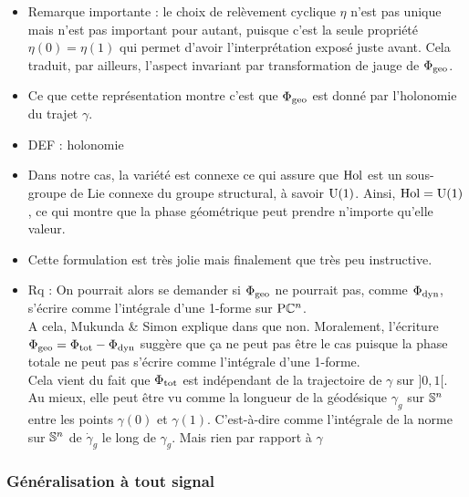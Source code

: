 \begin{itemize}
	\item Remarque importante : le choix de relèvement cyclique $\eta$ n'est pas unique mais n'est pas important pour autant, puisque c'est la seule propriété $\eta(0)=\eta(1)$ qui permet d'avoir l'interprétation exposé juste avant. Cela traduit, par ailleurs, l'aspect invariant par transformation de jauge de $\phaseg$.
	
	\item Ce que cette représentation montre c'est que $\phaseg$ est donné par l'holonomie du trajet $\gamma$.
	
	\item DEF : holonomie
	
	\item Dans notre cas, la variété est connexe ce qui assure que $\Hol$ est un sous-groupe de Lie connexe du groupe structural, à savoir $\U{1}$. Ainsi, $\Hol = \U{1}$, ce qui montre que la phase géométrique peut prendre n'importe qu'elle valeur.
	
	\item Cette formulation est très jolie mais finalement que très peu instructive. 
	
	\item Rq : On pourrait alors se demander si $\phaseg$ ne pourrait pas, comme $\phased$, s'écrire comme l'intégrale d'une 1-forme sur $\PC{n}$.
	\\
	A cela, Mukunda \& Simon explique dans \cite{mukunda_quantum_1993} que non. Moralement, l'écriture $\phaseg = \phaset - \phased$ suggère que ça ne peut pas être le cas puisque la phase totale ne peut pas s'écrire comme l'intégrale d'une 1-forme.
	\\
	
	 Cela vient du fait que $\phaset$ est indépendant de la trajectoire de $\gamma$ sur $]0,1[$. Au mieux, elle peut être vu comme la longueur de la géodésique $\gamma_g$ sur $\S{n}$ entre les points $\gamma(0)$ et $\gamma(1)$. C'est-à-dire comme l'intégrale de la norme sur $\S{n}$ de $\dot{\gamma}_g$ le long de $\gamma_g$. Mais rien par rapport à $\gamma$
	
\end{itemize}




\subsubsection{\todo  Généralisation à tout signal}

